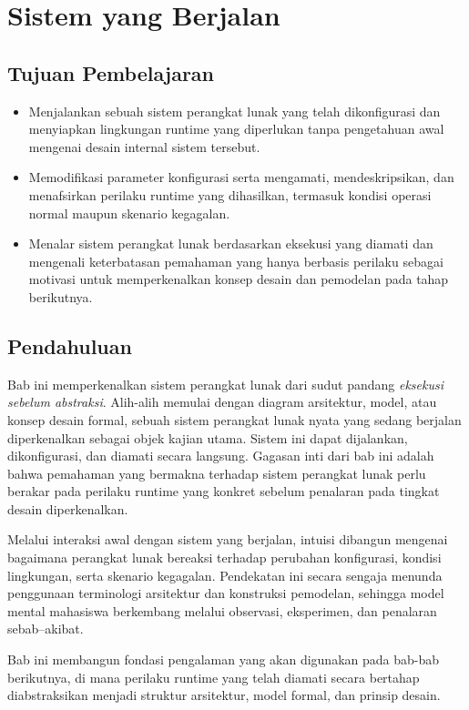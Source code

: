 \chapter{Sistem yang Berjalan}

\section*{Tujuan Pembelajaran}
\begin{itemize}
  \item Menjalankan sebuah sistem perangkat lunak yang telah dikonfigurasi dan
        menyiapkan lingkungan runtime yang diperlukan tanpa pengetahuan awal
        mengenai desain internal sistem tersebut.
  \item Memodifikasi parameter konfigurasi serta mengamati, mendeskripsikan, dan
        menafsirkan perilaku runtime yang dihasilkan, termasuk kondisi operasi
        normal maupun skenario kegagalan.
  \item Menalar sistem perangkat lunak berdasarkan eksekusi yang diamati dan
        mengenali keterbatasan pemahaman yang hanya berbasis perilaku sebagai
        motivasi untuk memperkenalkan konsep desain dan pemodelan pada tahap
        berikutnya.
\end{itemize}

\section{Pendahuluan}

Bab ini memperkenalkan sistem perangkat lunak dari sudut pandang
\emph{eksekusi sebelum abstraksi}. Alih-alih memulai dengan diagram arsitektur,
model, atau konsep desain formal, sebuah sistem perangkat lunak nyata yang
sedang berjalan diperkenalkan sebagai objek kajian utama. Sistem ini dapat
dijalankan, dikonfigurasi, dan diamati secara langsung. Gagasan inti dari bab
ini adalah bahwa pemahaman yang bermakna terhadap sistem perangkat lunak perlu
berakar pada perilaku runtime yang konkret sebelum penalaran pada tingkat desain
diperkenalkan.

Melalui interaksi awal dengan sistem yang berjalan, intuisi dibangun mengenai
bagaimana perangkat lunak bereaksi terhadap perubahan konfigurasi, kondisi
lingkungan, serta skenario kegagalan. Pendekatan ini secara sengaja menunda
penggunaan terminologi arsitektur dan konstruksi pemodelan, sehingga model mental
mahasiswa berkembang melalui observasi, eksperimen, dan penalaran sebab–akibat.

Bab ini membangun fondasi pengalaman yang akan digunakan pada bab-bab berikutnya,
di mana perilaku runtime yang telah diamati secara bertahap diabstraksikan
menjadi struktur arsitektur, model formal, dan prinsip desain.

